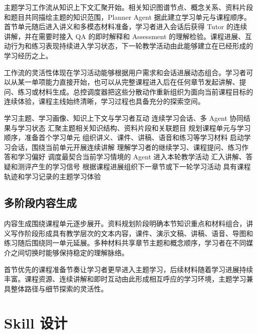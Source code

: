 主题学习工作流从知识上下文汇聚开始。相关知识图谱节点、概念关系、资料片段和题目共同描绘主题的知识范围，Planner Agent 据此建立学习单元与课程顺序。首节单元随后进入讲义和多模态材料准备，学习者进入会话后获得 Tutor 的连续讲解，并在需要时接入 QA 的即时解释和 Assessment 的理解检验。课程进展、互动行为和练习表现持续进入学习状态，下一轮教学活动由此能够建立在已经形成的学习经历之上。

工作流的灵活性体现在学习活动能够根据用户需求和会话进展动态组合。学习者可以从某一单项能力直接开始，也可以从完整课程进入后在任何章节发起讲解、提问、练习或材料生成。总控调度器把这些分散动作重新组织为面向当前课程目标的连续体验，课程主线始终清晰，学习过程也具备充分的探索空间。

\begin{algorithm}[H]
  \caption{主题学习的动态工作流编排}
  \label{alg:dynamic-dispatch}
  \begin{algorithmic}[1]
    \Require 学习主题、学习画像、知识上下文与学习者互动
    \Ensure 连续学习会话、多 Agent 协同结果与学习状态
    \State 汇聚主题相关知识结构、资料片段和关联题目
    \State 规划课程单元与学习顺序，准备首个学习单元
    \State 组织讲义、课件、讲稿、语音和练习等学习材料
    \State 启动学习会话，围绕当前单元开展连续讲解
      \State 理解学习者的继续学习、课程提问、练习作答和学习偏好
      \State 调度最契合当前学习情境的 Agent 进入本轮教学活动
      \State 汇入讲解、答疑和测评产生的学习信号
      \State 根据课程进展组织下一章节或下一轮学习活动
    \EndWhile
    \Return 具有课程轨迹和学习记录的主题学习体验
  \end{algorithmic}
\end{algorithm}

\subsection{多阶段内容生成}

内容生成围绕课程单元逐步展开。资料规划阶段明确本节知识重点和材料组合，讲义写作阶段形成具有教学层次的文本内容，课件、演示文稿、讲稿、语音、导图和练习随后围绕同一单元延展。多种材料共享章节主题和概念顺序，学习者在不同媒介之间切换时能够保持稳定的理解脉络。

首节优先的课程准备节奏让学习者更早进入主题学习，后续材料随着学习进展持续丰富。课程资源、连续讲解和即时互动由此形成相互呼应的学习环境，主题学习兼具整体路径与细节探索的灵活性。

\section{Skill 设计}

